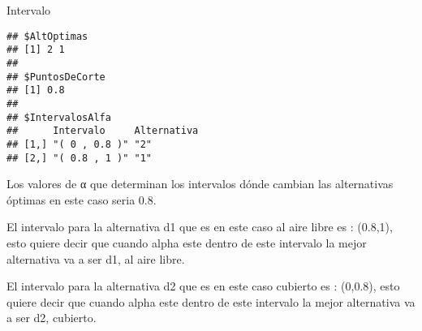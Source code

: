 \documentclass[
]{article}
\newenvironment{Shaded}{\begin{snugshade}}{\end{snugshade}}
\newcommand{\NormalTok}[1]{#1}
\begin{document}
\begin{Shaded}
\begin{Highlighting}[]
\NormalTok{Intervalo}
\end{Highlighting}
\end{Shaded}

\begin{verbatim}
## $AltOptimas
## [1] 2 1
## 
## $PuntosDeCorte
## [1] 0.8
## 
## $IntervalosAlfa
##      Intervalo     Alternativa
## [1,] "( 0 , 0.8 )" "2"        
## [2,] "( 0.8 , 1 )" "1"
\end{verbatim}

Los valores de α que determinan los intervalos dónde cambian las
alternativas óptimas en este caso seria 0.8.

El intervalo para la alternativa d1 que es en este caso al aire libre es
: (0.8,1), esto quiere decir que cuando alpha este dentro de este
intervalo la mejor alternativa va a ser d1, al aire libre.

El intervalo para la alternativa d2 que es en este caso cubierto es :
(0,0.8), esto quiere decir que cuando alpha este dentro de este
intervalo la mejor alternativa va a ser d2, cubierto.
\end{document}
